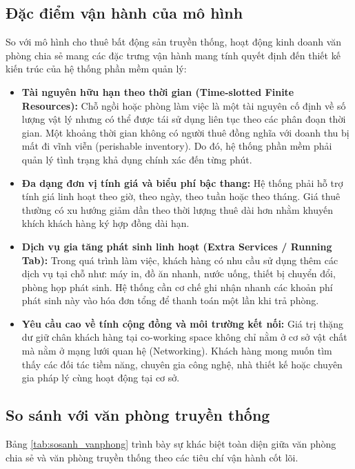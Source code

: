 \subsection{Đặc điểm vận hành của mô hình}
So với mô hình cho thuê bất động sản truyền thống, hoạt động kinh doanh văn phòng chia sẻ mang các đặc trưng vận hành mang tính quyết định đến thiết kế kiến trúc của hệ thống phần mềm quản lý:
\begin{itemize}
    \item \textbf{Tài nguyên hữu hạn theo thời gian (Time-slotted Finite Resources):} Chỗ ngồi hoặc phòng làm việc là một tài nguyên cố định về số lượng vật lý nhưng có thể được tái sử dụng liên tục theo các phân đoạn thời gian. Một khoảng thời gian không có người thuê đồng nghĩa với doanh thu bị mất đi vĩnh viễn (perishable inventory). Do đó, hệ thống phần mềm phải quản lý tình trạng khả dụng chính xác đến từng phút.
    \item \textbf{Đa dạng đơn vị tính giá và biểu phí bậc thang:} Hệ thống phải hỗ trợ tính giá linh hoạt theo giờ, theo ngày, theo tuần hoặc theo tháng. Giá thuê thường có xu hướng giảm dần theo thời lượng thuê dài hơn nhằm khuyến khích khách hàng ký hợp đồng dài hạn.
    \item \textbf{Dịch vụ gia tăng phát sinh linh hoạt (Extra Services / Running Tab):} Trong quá trình làm việc, khách hàng có nhu cầu sử dụng thêm các dịch vụ tại chỗ như: máy in, đồ ăn nhanh, nước uống, thiết bị chuyển đổi, phòng họp phát sinh. Hệ thống cần cơ chế ghi nhận nhanh các khoản phí phát sinh này vào hóa đơn tổng để thanh toán một lần khi trả phòng.
    \item \textbf{Yêu cầu cao về tính cộng đồng và môi trường kết nối:} Giá trị thặng dư giữ chân khách hàng tại co-working space không chỉ nằm ở cơ sở vật chất mà nằm ở mạng lưới quan hệ (Networking). Khách hàng mong muốn tìm thấy các đối tác tiềm năng, chuyên gia công nghệ, nhà thiết kế hoặc chuyên gia pháp lý cùng hoạt động tại cơ sở.
\end{itemize}

\subsection{So sánh với văn phòng truyền thống}
Bảng \ref{tab:sosanh_vanphong} trình bày sự khác biệt toàn diện giữa văn phòng chia sẻ và văn phòng truyền thống theo các tiêu chí vận hành cốt lõi.


